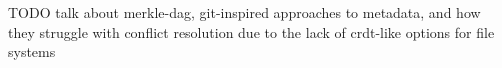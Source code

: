 \documentclass[a4paper,10pt]{article} \usepackage[utf8]{inputenc}
\newcommand{\todo}[1]{{\color{red} TODO #1 }}
\begin{document}

\todo{talk about merkle-dag, git-inspired approaches to metadata, and how
they struggle with conflict resolution due to the lack of crdt-like options for
file systems}

\newpage  \begingroup \raggedright
 \endgroup
\end{document}
